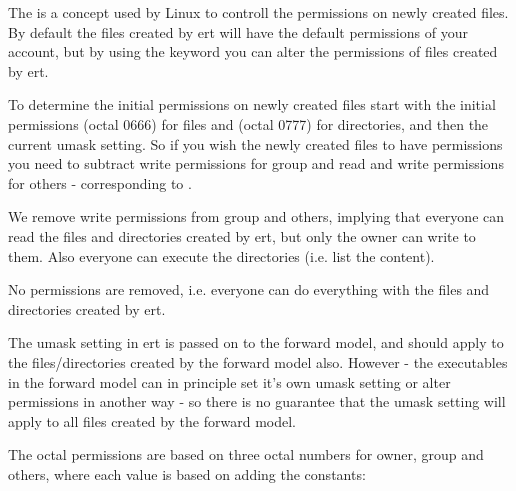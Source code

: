 \documentclass[letterpaper,10pt,english]{sphinxmanual}
\begin{document}
\label{\detokenize{keywords/index:umask}}
\begin{sphinxShadowBox}

The  is a concept used by Linux to controll the permissions on
newly created files. By default the files created by ert will have the
default permissions of your account, but by using the keyword 
you can alter the permissions of files created by ert.

To determine the initial permissions on newly created files start with
the initial permissions  (octal 0666) for files and
 (octal 0777) for directories, and then  the
current umask setting. So if you wish the newly created files to have
permissions  you need to subtract write permissions for
group and read and write permissions for others - corresponding to
.

%
\begin{sphinxVerbatim}[commandchars=\\\{\}]
 
\end{sphinxVerbatim}

We remove write permissions from group and others, implying that
everyone can read the files and directories created by ert, but only the
owner can write to them. Also everyone can execute the directories (i.e.
list the content).

%
\begin{sphinxVerbatim}[commandchars=\\\{\}]
 
\end{sphinxVerbatim}

No permissions are removed, i.e. everyone can do everything with the
files and directories created by ert.

The umask setting in ert is passed on to the forward model, and should
apply to the files/directories created by the forward model also.
However - the executables in the forward model can in principle set it’s
own umask setting or alter permissions in another way - so there is no
guarantee that the umask setting will apply to all files created by the
forward model.

The octal permissions are based on three octal numbers for owner, group
and others, where each value is based on adding the constants:
\begin{quote}


\end{quote}
\end{sphinxShadowBox}
\end{document}
